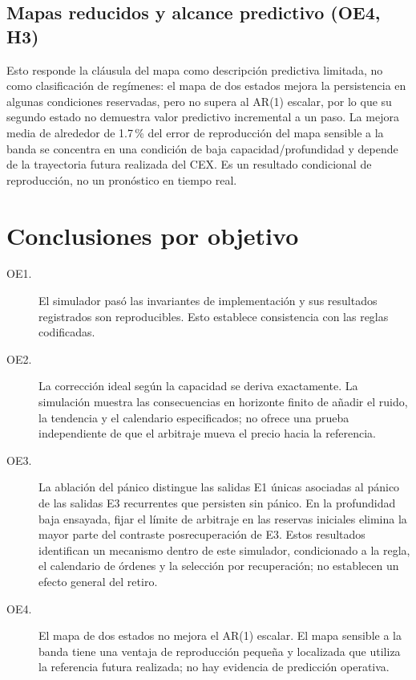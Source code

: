 \subsection{Mapas reducidos y alcance predictivo (OE4, H3)}

Esto responde la cláusula del mapa como descripción predictiva limitada, no como clasificación de regímenes: el mapa de dos estados mejora la persistencia en algunas condiciones reservadas, pero no supera al AR(1) escalar, por lo que su segundo estado no demuestra valor predictivo incremental a un paso. La mejora media de alrededor de 1.7\,\% del error de reproducción del mapa sensible a la banda se concentra en una condición de baja capacidad/profundidad y depende de la trayectoria futura realizada del CEX. Es un resultado condicional de reproducción, no un pronóstico en tiempo real.

\section{Conclusiones por objetivo}

\begin{description}
  \item[OE1.] El simulador pasó las invariantes de implementación y sus resultados registrados son reproducibles. Esto establece consistencia con las reglas codificadas.
  \item[OE2.] La corrección ideal según la capacidad se deriva exactamente. La simulación muestra las consecuencias en horizonte finito de añadir el ruido, la tendencia y el calendario especificados; no ofrece una prueba independiente de que el arbitraje mueva el precio hacia la referencia.
  \item[OE3.] La ablación del pánico distingue las salidas E1 únicas asociadas al pánico de las salidas E3 recurrentes que persisten sin pánico. En la profundidad baja ensayada, fijar el límite de arbitraje en las reservas iniciales elimina la mayor parte del contraste posrecuperación de E3. Estos resultados identifican un mecanismo dentro de este simulador, condicionado a la regla, el calendario de órdenes y la selección por recuperación; no establecen un efecto general del retiro.
  \item[OE4.] El mapa de dos estados no mejora el AR(1) escalar. El mapa sensible a la banda tiene una ventaja de reproducción pequeña y localizada que utiliza la referencia futura realizada; no hay evidencia de predicción operativa.
\end{description}

